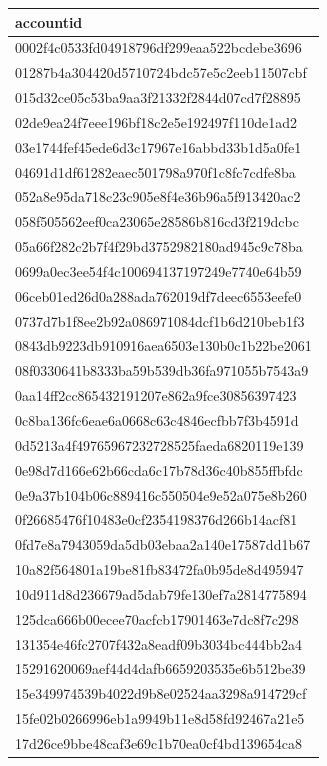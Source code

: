 \begin{tabular}{l}
\toprule
accountid \\
\midrule
0002f4c0533fd04918796df299eaa522bcdebe3696 \\
01287b4a304420d5710724bdc57e5c2eeb11507cbf \\
015d32ce05c53ba9aa3f21332f2844d07cd7f28895 \\
02de9ea24f7eee196bf18c2e5e192497f110de1ad2 \\
03e1744fef45ede6d3c17967e16abbd33b1d5a0fe1 \\
04691d1df61282eaec501798a970f1c8fc7cdfe8ba \\
052a8e95da718c23c905e8f4e36b96a5f913420ac2 \\
058f505562eef0ca23065e28586b816cd3f219dcbc \\
05a66f282c2b7f4f29bd3752982180ad945c9c78ba \\
0699a0ec3ee54f4c100694137197249e7740e64b59 \\
06ceb01ed26d0a288ada762019df7deec6553eefe0 \\
0737d7b1f8ee2b92a086971084dcf1b6d210beb1f3 \\
0843db9223db910916aea6503e130b0c1b22be2061 \\
08f0330641b8333ba59b539db36fa971055b7543a9 \\
0aa14ff2cc865432191207e862a9fce30856397423 \\
0c8ba136fc6eae6a0668c63c4846ecfbb7f3b4591d \\
0d5213a4f49765967232728525faeda6820119e139 \\
0e98d7d166e62b66cda6c17b78d36c40b855ffbfdc \\
0e9a37b104b06c889416c550504e9e52a075e8b260 \\
0f26685476f10483e0cf2354198376d266b14acf81 \\
0fd7e8a7943059da5db03ebaa2a140e17587dd1b67 \\
10a82f564801a19be81fb83472fa0b95de8d495947 \\
10d911d8d236679ad5dab79fe130ef7a2814775894 \\
125dca666b00ecee70acfcb17901463e7dc8f7c298 \\
131354e46fc2707f432a8eadf09b3034bc444bb2a4 \\
15291620069aef44d4dafb6659203535e6b512be39 \\
15e349974539b4022d9b8e02524aa3298a914729cf \\
15fe02b0266996eb1a9949b11e8d58fd92467a21e5 \\
17d26ce9bbe48caf3e69c1b70ea0cf4bd139654ca8 \\

\end{tabular}
